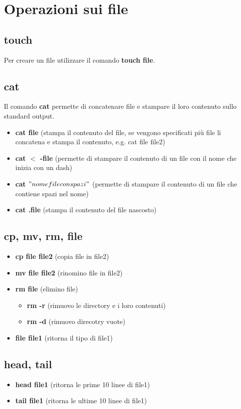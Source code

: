 \documentclass[oneside,a4paper,11pt]{book}
\theoremstyle{italicstyle}
\theoremstyle{normStyle}
\begin{document}
\section{Operazioni sui file}
\subsection{touch}
Per creare un file utilizzare il comando \textbf{touch file}.

\subsection{cat}
Il comando \textbf{cat} permette di concatenare file e stampare il loro contenuto sullo standard output.
\begin{itemize}
    \item \textbf{cat file} (stampa il contenuto del file, se vengono specificati più file li concatena e stampa il contenuto, e.g. cat file file2)
    \item \textbf{cat $<$ -file} (permette di stampare il contenuto di un file con il nome che inizia con un dash)
    \item \textbf{cat $"nome file con spazi"$} (permette di stampare il contenuto di un file che contiene spazi nel nome)
    \item \textbf{cat .file} (stampa il contenuto del file nascosto)
\end{itemize}

\subsection{cp, mv, rm, file}
\begin{itemize}
    \item \textbf{cp file file2} (copia file in file2)
    \item \textbf{mv file file2} (rinomino file in file2)
    \item \textbf{rm file} (elimino file)
        \begin{itemize}
            \item \textbf{rm -r} (rimuovo le directory e i loro contenuti)
            \item \textbf{rm -d} (rimuovo direcotry vuote)
        \end{itemize}
    \item \textbf{file file1} (ritorna il tipo di file1)
\end{itemize}

\subsection{head, tail}
\begin{itemize}
    \item \textbf{head file1} (ritorna le prime 10 linee di file1)
    \item \textbf{tail file1} (ritorna le ultime 10 linee di file1)
\end{itemize}
\end{document}
